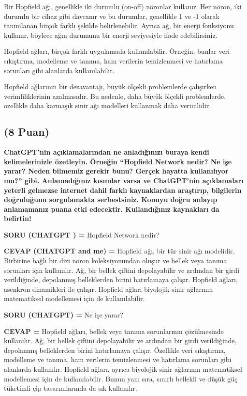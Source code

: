 \documentclass[11pt]{article}
\begin{document}
Bir Hopfield ağı, genellikle iki durumlu (on-off) nöronlar kullanır. Her nöron, iki durumlu bir cihaz gibi davranır ve bu durumlar, genellikle 1 ve -1 olarak tanımlanan birçok farklı şekilde belirlenebilir. Ayrıca ağ, bir enerji fonksiyonu kullanır, böylece ağın durumunu bir enerji seviyesiyle ifade edebilirsiniz.

Hopfield ağları, birçok farklı uygulamada kullanılabilir. Örneğin, bunlar veri sıkıştırma, modelleme ve tanıma, ham verilerin temizlenmesi ve hatırlama sorunları gibi alanlarda kullanılabilir.

Hopfield ağlarının bir dezavantajı, büyük ölçekli problemlerde çalışırken verimliliklerinin azalmasıdır. Bu nedenle, daha büyük ölçekli problemlerde, özellikle daha karmaşık sinir ağı modelleri kullanmak daha verimlidir.


\subsection{(8 Puan)} \textbf{ChatGPT’nin açıklamalarından ne anladığınızı buraya kendi kelimelerinizle özetleyin. Örneğin ``Hopfield Network nedir? Ne işe yarar? Neden bilmemiz gerekir bunu? Gerçek hayatta kullanılıyor mu?'' gibi. Anlamadığınız kısımlar varsa ve ChatGPT’nin açıklamaları yeterli gelmezse internet dahil farklı kaynaklardan araştırıp, bilgilerin doğruluğunu sorgulamakta serbestsiniz. Konuyu doğru anlayıp anlamamanız puana etki edecektir. Kullandığınız kaynakları da belirtin!}

\textbf{SORU (CHATGPT ) =} Hopfield Network nedir? 

\textbf{CEVAP (CHATGPT and me) =} Hopfield ağı, bir tür sinir ağı modelidir. Birbirine bağlı bir dizi nöron koleksiyonundan oluşur ve bellek veya tanıma sorunları için kullanılır. Ağ, bir bellek çiftini depolayabilir ve ardından bir girdi verildiğinde, depolanmış belleklerden birini hatırlamaya çalışır. Hopfield ağları, asenkron dinamikleri ile çalışır. Hopfield ağları biyolojik sinir ağlarının matematiksel modellemesi için de kullanılabilir.

\textbf{SORU (CHATGPT) =} Ne işe yarar? 

\textbf{CEVAP =} Hopfield ağları, bellek veya tanıma sorunlarının çözülmesinde kullanılır. Ağ, bir bellek çiftini depolayabilir ve ardından bir girdi verildiğinde, depolanmış belleklerden birini hatırlamaya çalışır. Özellikle veri sıkıştırma, modelleme ve tanıma, ham verilerin temizlenmesi ve hatırlama sorunları gibi alanlarda kullanılır. Hopfield ağları, ayrıca biyolojik sinir ağlarının matematiksel modellemesi için de kullanılabilir. Bunun yanı sıra, sınırlı bellekli ve düşük güç tüketimli çip tasarımlarında da sık kullanılır.
\end{document}
